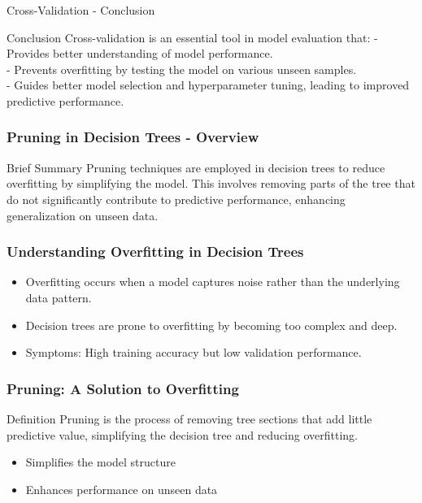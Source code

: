 \documentclass[aspectratio=169]{beamer}
\begin{document}
\begin{frame}[fragile]{Cross-Validation - Conclusion}
    \begin{block}{Conclusion}
        Cross-validation is an essential tool in model evaluation that:
        - Provides better understanding of model performance.\\
        - Prevents overfitting by testing the model on various unseen samples.\\
        - Guides better model selection and hyperparameter tuning, leading to improved predictive performance.
    \end{block}
\end{frame}

\begin{frame}[fragile]
    \frametitle{Pruning in Decision Trees - Overview}
    \begin{block}{Brief Summary}
        Pruning techniques are employed in decision trees to reduce overfitting by simplifying the model. This involves removing parts of the tree that do not significantly contribute to predictive performance, enhancing generalization on unseen data.
    \end{block}
\end{frame}

\begin{frame}[fragile]
    \frametitle{Understanding Overfitting in Decision Trees}
    \begin{itemize}
        \item Overfitting occurs when a model captures noise rather than the underlying data pattern.
        \item Decision trees are prone to overfitting by becoming too complex and deep.
        \item Symptoms: High training accuracy but low validation performance.
    \end{itemize}
\end{frame}

\begin{frame}[fragile]
    \frametitle{Pruning: A Solution to Overfitting}
    \begin{block}{Definition}
        Pruning is the process of removing tree sections that add little predictive value, simplifying the decision tree and reducing overfitting.
    \end{block}
    
    \begin{itemize}
        \item Simplifies the model structure
        \item Enhances performance on unseen data
    \end{itemize}
\end{frame}
\end{document}
